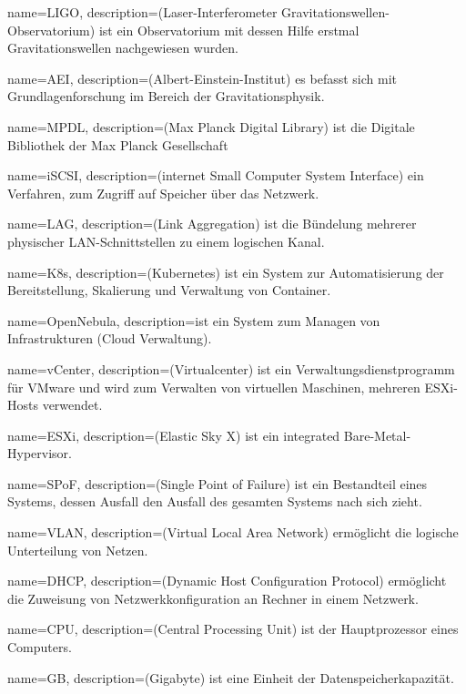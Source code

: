 {
name=LIGO,
description={(Laser-Interferometer Gravitationswellen-Observatorium) ist ein Observatorium mit dessen Hilfe erstmal Gravitationswellen nachgewiesen wurden.}
}

{
name=AEI,
description={(Albert-Einstein-Institut) es befasst sich mit Grundlagenforschung im Bereich der Gravitationsphysik.}
}

{
name=MPDL,
description={(Max Planck Digital Library) ist die Digitale Bibliothek der Max Planck Gesellschaft}
}

{
name=iSCSI,
description={(internet Small Computer System Interface) ein Verfahren, zum  Zugriff auf Speicher über das Netzwerk.}
}

{
name=LAG,
description={(Link Aggregation) ist die Bündelung mehrerer physischer LAN-Schnittstellen zu einem logischen Kanal.}
}

{
name=K8s,
description={(Kubernetes) ist ein System zur Automatisierung der Bereitstellung, Skalierung und Verwaltung von Container.}
}

{
name=OpenNebula,
description={ist ein System zum  Managen von Infrastrukturen (Cloud Verwaltung).}
}

{
name=vCenter,
description={(Virtualcenter) ist ein Verwaltungsdienstprogramm für VMware und wird zum Verwalten von virtuellen Maschinen, mehreren ESXi-Hosts verwendet.}
}

{
name=ESXi,
description={(Elastic Sky X) ist ein integrated Bare-Metal-Hypervisor.}
}

{
name=SPoF,
description={(Single Point of Failure) ist ein Bestandteil eines Systems, dessen Ausfall den Ausfall des gesamten Systems nach sich zieht.}
}

{
name=VLAN,
description={(Virtual Local Area Network) ermöglicht die logische Unterteilung von Netzen.}
}

{
name=DHCP,
description={(Dynamic Host Configuration Protocol) ermöglicht die Zuweisung von Netzwerkkonfiguration an Rechner in einem Netzwerk.}
}

{
name=CPU,
description={(Central Processing Unit) ist der Hauptprozessor eines Computers.}
}

{
name=GB,
description={(Gigabyte) ist eine Einheit der Datenspeicherkapazität.}
}

